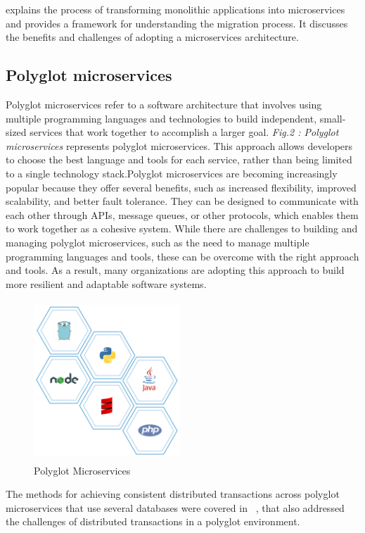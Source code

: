 \cite{escobar2016towards}explains the process of transforming monolithic applications into microservices and provides a framework for understanding the migration process. It discusses the benefits and challenges of adopting a microservices architecture.

\subsection{ Polyglot microservices}
Polyglot microservices refer to a software architecture that involves using multiple programming languages and technologies to build independent, small-sized services that work together to accomplish a larger goal. \emph{Fig.2 : Polyglot microservices} represents polyglot microservices. This approach allows developers to choose the best language and tools for each service, rather than being limited to a single technology stack.Polyglot microservices are becoming increasingly popular because they offer several benefits, such as increased flexibility, improved scalability, and better fault tolerance. They can be designed to communicate with each other through APIs, message queues, or other protocols, which enables them to work together as a cohesive system.
While there are challenges to building and managing polyglot microservices, such as the need to manage multiple programming languages and tools, these can be overcome with the right approach and tools. As a result, many organizations are adopting this approach to build more resilient and adaptable software systems.

\begin{figure}
\centering
\includegraphics[width=5.5cm, height=6cm]{polyglot_microservices}
\caption{Polyglot Microservices}
\end{figure}

The methods for achieving consistent distributed transactions across polyglot microservices that use several databases were covered in  ~\cite{zhang2019grit}, that also addressed the challenges of distributed transactions in a polyglot environment.

